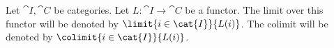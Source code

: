 \begin{notation}
Let $\cat{I},\cat{C}$ be categories.
Let $L: \cat{I} \rightarrow \cat{C}$ be a functor.
The limit over this functor will be denoted by
$\limit{i \in \cat{I}}{L(i)}$.
The colimit will be denoted by
$\colimit{i \in \cat{I}}{L(i)}$.
\end{notation}